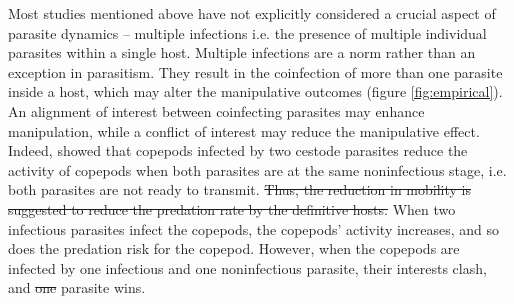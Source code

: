 \documentclass[a4paper]{scrartcl}
\providecommand{\DIFaddtex}[1]{{\protect\color{blue}\uwave{#1}}} %
\providecommand{\DIFdeltex}[1]{{\protect\color{red}\sout{#1}}}                      %
\providecommand{\DIFaddbegin}{} %
\providecommand{\DIFaddend}{} %
\providecommand{\DIFdelbegin}{} %
\providecommand{\DIFdelend}{} %
\providecommand{\DIFadd}[1]{\texorpdfstring{\DIFaddtex{#1}}{#1}} %
\providecommand{\DIFdel}[1]{\texorpdfstring{\DIFdeltex{#1}}{}} %
\newcommand{\DIFscaledelfig}{0.5}
\newlength{\DIFdelgraphicswidth} %
\newlength{\DIFdelgraphicsheight} %
\newcommand{\DIFaddincludegraphics}[2][]{{\color{blue}\fbox{\DIFOincludegraphics[#1]{#2}}}} %
\newcommand{\DIFdelincludegraphics}[2][]{%
\sbox{\DIFdelgraphicsbox}{\DIFOincludegraphics[#1]{#2}}%
\settoboxwidth{\DIFdelgraphicswidth}{\DIFdelgraphicsbox} %
\settoboxtotalheight{\DIFdelgraphicsheight}{\DIFdelgraphicsbox} %
\scalebox{\DIFscaledelfig}{%
\parbox[b]{\DIFdelgraphicswidth}{\usebox{\DIFdelgraphicsbox}\\[-\baselineskip] \rule{\DIFdelgraphicswidth}{0em}}\llap{\resizebox{\DIFdelgraphicswidth}{\DIFdelgraphicsheight}{%
\setlength{\unitlength}{\DIFdelgraphicswidth}%
\begin{picture}(1,1)%
\thicklines\linethickness{2pt} %
{\color[rgb]{1,0,0}\put(0,0){\framebox(1,1){}}}%
{\color[rgb]{1,0,0}\put(0,0){\line( 1,1){1}}}%
{\color[rgb]{1,0,0}\put(0,1){\line(1,-1){1}}}%
\end{picture}%
}\hspace*{3pt}}} %
} %
\DeclareRobustCommand{\DIFaddbegin}{\DIFOaddbegin \let\includegraphics\DIFaddincludegraphics} %
\DeclareRobustCommand{\DIFaddend}{\DIFOaddend \let\includegraphics\DIFOincludegraphics} %
\DeclareRobustCommand{\DIFdelbegin}{\DIFOdelbegin \let\includegraphics\DIFdelincludegraphics} %
\DeclareRobustCommand{\DIFdelend}{\DIFOaddend \let\includegraphics\DIFOincludegraphics} %
\begin{document}
Most studies mentioned above have not explicitly considered a crucial aspect of parasite dynamics -- multiple infections \citep{kalbe:JFB:2002} i.e. the presence of multiple individual parasites within a single host.
Multiple infections are a norm rather than an exception in parasitism. 
They result in the coinfection of more than one parasite inside a host, which may alter the manipulative outcomes (figure \ref{fig:empirical}). 
An alignment of interest between coinfecting parasites may enhance manipulation, while a conflict of interest may reduce the manipulative effect. 
Indeed, \cite{Hafer:2015gl} showed that copepods infected by two cestode parasites reduce the activity of copepods when both parasites are at the same noninfectious stage, i.e. both parasites are not ready to transmit. 
\DIFdelbegin \DIFdel{Thus, the reduction in mobility is suggested to reduce the predation rate by the definitive hosts. 
}\DIFdelend %
When two infectious parasites infect the copepods, the copepods' activity increases, and so does the predation risk for the copepod. 
However, when the copepods are infected by one infectious and one noninfectious parasite, their interests clash, and \DIFdelbegin \DIFdel{one }\DIFdelend \DIFaddbegin \DIFadd{the infectious }\DIFaddend parasite wins. 
\end{document}
